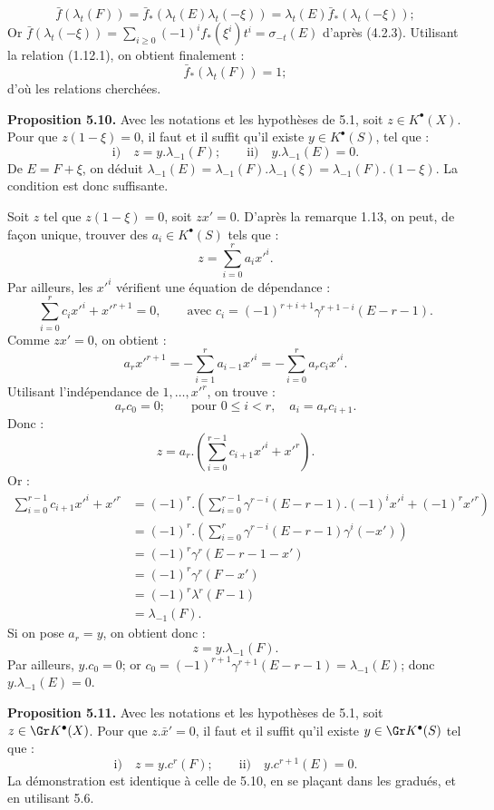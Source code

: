 \[
  \bar f(\lambda_t(F))=
  \bar f_*(\lambda_t(E)\lambda_t(-\xi))=
  \lambda_t(E)\bar f_*(\lambda_t(-\xi));
\]
Or $\bar f(\lambda_t(-\xi))=\sum_{i\ge0}(-1)^if_*(\xi^i)t^i=\sigma_{-t}(E)$ d'après (4.2.3).
Utilisant la relation (1.12.1), on obtient finalement :
\[
  \bar f_*(\lambda_t(F))=1;
\]
d'où les relations cherchées.

\textbf{Proposition 5.10.} Avec les notations et les hypothèses de 5.1, soit $z\in K^{\bullet}(X)$. Pour que $z(1-\xi)=0$, il faut et il suffit qu'il existe $y\in K^{\bullet}(S)$, tel que :
\[
  \text{i)}\quad z=y.\lambda_{-1}(F);
  \qquad
  \text{ii)}\quad y.\lambda_{-1}(E)=0.
\]
De $E=F+\xi$, on déduit $\lambda_{-1}(E)=\lambda_{-1}(F).\lambda_{-1}(\xi)=\lambda_{-1}(F).(1-\xi)$. La condition est donc suffisante.

Soit $z$ tel que $z(1-\xi)=0$, soit $zx'=0$. D'après la remarque 1.13, on peut, de façon unique, trouver des $a_i\in K^{\bullet}(S)$ tels que :
\[
  z=\sum_{i=0}^{r}a_i{x'}^i .
\]
Par ailleurs, les ${x'}^i$ vérifient une équation de dépendance :
\[
  \sum_{i=0}^{r}c_i{x'}^i+{x'}^{r+1}=0,
  \qquad \text{avec } c_i=(-1)^{r+i+1}\gamma^{r+1-i}(E-r-1).
\]
Comme $zx'=0$, on obtient :
\[
  a_r{x'}^{r+1}=-\sum_{i=1}^{r}a_{i-1}{x'}^i
  =-\sum_{i=0}^{r}a_rc_i{x'}^i .
\]
Utilisant l'indépendance de $1,\ldots,{x'}^r$, on trouve :
\[
  a_rc_0=0;
  \qquad \text{pour } 0\le i<r,
  \quad a_i=a_rc_{i+1}.
\]
Donc :
\[
  z=a_r.\left(\sum_{i=0}^{r-1}c_{i+1}{x'}^i+{x'}^r\right).
\]
Or :
\[
\begin{aligned}
\sum_{i=0}^{r-1}c_{i+1}{x'}^i+{x'}^r
&=(-1)^r.\left(\sum_{i=0}^{r-1}\gamma^{r-i}(E-r-1).(-1)^i{x'}^i+(-1)^r{x'}^r\right)\\
&=(-1)^r.\left(\sum_{i=0}^{r}\gamma^{r-i}(E-r-1)\gamma^i(-x')\right)\\
&=(-1)^r\gamma^r(E-r-1-x')\\
&=(-1)^r\gamma^r(F-x')\\
&=(-1)^r\lambda^r(F-1)\\
&=\lambda_{-1}(F).
\end{aligned}
\]
Si on pose $a_r=y$, on obtient donc :
\[
  z=y.\lambda_{-1}(F).
\]
Par ailleurs, $y.c_0=0$; or $c_0=(-1)^{r+1}\gamma^{r+1}(E-r-1)=\lambda_{-1}(E)$; donc $y.\lambda_{-1}(E)=0$.

\textbf{Proposition 5.11.} Avec les notations et les hypothèses de 5.1, soit $z\in \Gr K^{\bullet}(X)$. Pour que $z.\bar x'=0$, il faut et il suffit qu'il existe $y\in \Gr K^{\bullet}(S)$ tel que :
\[
  \text{i)}\quad z=y.c^r(F);
  \qquad
  \text{ii)}\quad y.c^{r+1}(E)=0.
\]
La démonstration est identique à celle de 5.10, en se plaçant dans les gradués, et en utilisant 5.6.


